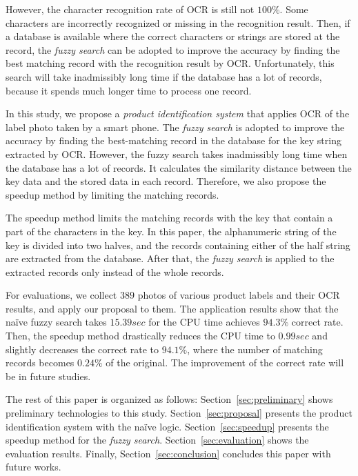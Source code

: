 \documentclass[technicalreport]{ieicej}
\begin{document}
    However, the character recognition rate of OCR is still not $100\%$. Some characters are incorrectly recognized or missing in the recognition result. Then, if a database is available where the correct characters or strings are stored at the record, the {\em fuzzy search} can be adopted to improve the accuracy by finding the best matching record with the recognition result by OCR. Unfortunately, this search will take inadmissibly long time if the database has a lot of records, because it spends much longer time to process one record. 

    In this study, we propose a {\em product identification system} that applies OCR of the label photo taken by a smart phone. The {\em fuzzy search} is adopted to improve the accuracy by finding the best-matching record in the database for the key string extracted by OCR. However, the fuzzy search takes inadmissibly long time when the database has a lot of records. It calculates the similarity distance between the key data and the stored data in each record. Therefore, we also propose the speedup method by limiting the matching records. 

    The speedup method limits the matching records with the key that contain a part of the characters in the key. In this paper, the alphanumeric string of the key is divided into two halves, and the records containing either of the half string are extracted from the database. After that, the {\em fuzzy search} is applied to the extracted records only instead of the whole records. 

    For evaluations, we collect $389$ photos of various product labels and their OCR results, and apply our proposal to them. The application results show that the naïve fuzzy search takes $15.39sec$ for the CPU time achieves $94.3\%$ correct rate. Then, the speedup method drastically reduces the CPU time to $0.99sec$ and slightly decreases the correct rate to $94.1\%$, where the number of matching records becomes $0.24\%$ of the original. The improvement of the correct rate will be in future studies.

    The rest of this paper is organized as follows:
    Section~\ref{sec:preliminary} shows preliminary technologies to this study.
    Section~\ref{sec:proposal} presents the product identification system with the naïve logic.
    Section~\ref{sec:speedup} presents the speedup method for the {\em fuzzy search}.
    Section~\ref{sec:evaluation} shows the evaluation results.
    Finally, Section~\ref{sec:conclusion} concludes this paper with future works.
\end{document}
